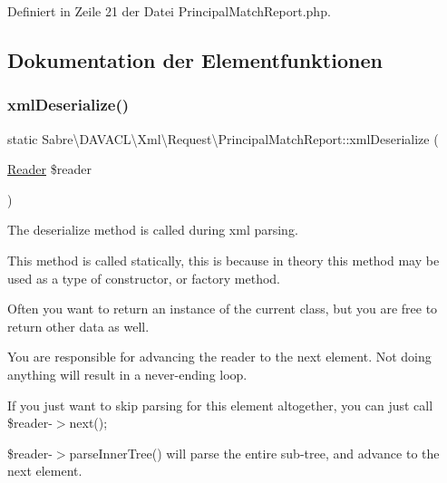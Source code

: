 Definiert in Zeile 21 der Datei Principal\+Match\+Report.\+php.



\subsection{Dokumentation der Elementfunktionen}
\mbox{\label{class_sabre_1_1_d_a_v_a_c_l_1_1_xml_1_1_request_1_1_principal_match_report_a128e85bc1d7c68e4496f49158891edaf}} 
\subsubsection{\texorpdfstring{xml\+Deserialize()}{xmlDeserialize()}}
{\footnotesize\ttfamily static Sabre\textbackslash{}\+D\+A\+V\+A\+C\+L\textbackslash{}\+Xml\textbackslash{}\+Request\textbackslash{}\+Principal\+Match\+Report\+::xml\+Deserialize (\begin{DoxyParamCaption}\item[{\mbox{\hyperlink{class_sabre_1_1_xml_1_1_reader}{Reader}}}]{\$reader }\end{DoxyParamCaption})\hspace{0.3cm}{\ttfamily [static]}}

The deserialize method is called during xml parsing.

This method is called statically, this is because in theory this method may be used as a type of constructor, or factory method.

Often you want to return an instance of the current class, but you are free to return other data as well.

You are responsible for advancing the reader to the next element. Not doing anything will result in a never-\/ending loop.

If you just want to skip parsing for this element altogether, you can just call \$reader-\/$>$next();

\$reader-\/$>$parse\+Inner\+Tree() will parse the entire sub-\/tree, and advance to the next element.


